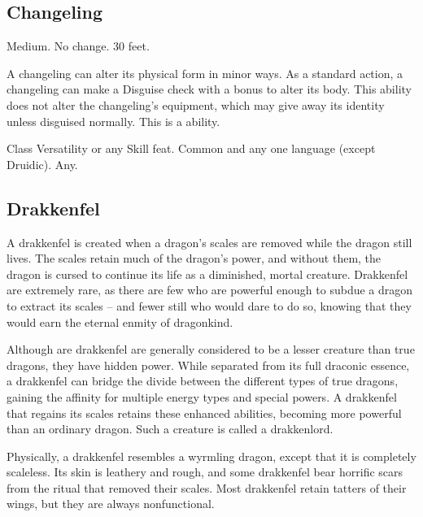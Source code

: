     \subsection{Changeling}

         Medium.
         No change.
         30 feet.
        \begin{itemize}
             A changeling can alter its physical form in minor ways. As a standard action, a changeling can make a Disguise check with a  bonus to alter its body. This ability does not alter the changeling's equipment, which may give away its identity unless disguised normally.
                This is a  ability.
        \end{itemize}
         Class Versatility or any Skill feat.
         Common and any one language (except Druidic).
         Any.

    \subsection{Drakkenfel}

        A drakkenfel is created when a dragon's scales are removed while the dragon still lives. The scales retain much of the dragon's power, and without them, the dragon is cursed to continue its life as a diminished, mortal creature.
        Drakkenfel are extremely rare, as there are few who are powerful enough to subdue a dragon to extract its scales -- and fewer still who would dare to do so, knowing that they would earn the eternal enmity of dragonkind.

        Although are drakkenfel are generally considered to be a lesser creature than true dragons, they have hidden power.
        While separated from its full draconic essence, a drakkenfel can bridge the divide between the different types of true dragons, gaining the affinity for multiple energy types and special powers.
        A drakkenfel that regains its scales retains these enhanced abilities, becoming more powerful than an ordinary dragon.
        Such a creature is called a drakkenlord.

        Physically, a drakkenfel resembles a wyrmling dragon, except that it is completely scaleless.
        Its skin is leathery and rough, and some drakkenfel bear horrific scars from the ritual that removed their scales.
        Most drakkenfel retain tatters of their wings, but they are always nonfunctional.


